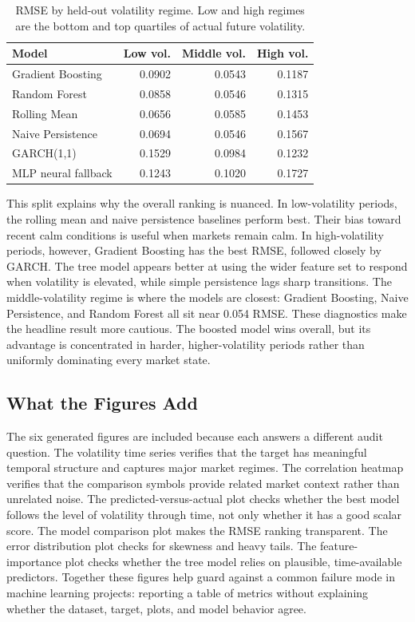 \documentclass{article}
\begin{document}
\begin{table}[t]
  \centering
  \caption{RMSE by held-out volatility regime. Low and high regimes are the bottom and top quartiles of actual future volatility.}
  \label{tab:regime}
  \begin{tabular}{lrrr}
    \toprule
    Model & Low vol. & Middle vol. & High vol. \\
    \midrule
    Gradient Boosting & 0.0902 & 0.0543 & 0.1187 \\
    Random Forest & 0.0858 & 0.0546 & 0.1315 \\
    Rolling Mean & 0.0656 & 0.0585 & 0.1453 \\
    Naive Persistence & 0.0694 & 0.0546 & 0.1567 \\
    GARCH(1,1) & 0.1529 & 0.0984 & 0.1232 \\
    MLP neural fallback & 0.1243 & 0.1020 & 0.1727 \\
    \bottomrule
  \end{tabular}
\end{table}

This split explains why the overall ranking is nuanced. In low-volatility periods, the rolling mean and naive persistence baselines perform best. Their bias toward recent calm conditions is useful when markets remain calm. In high-volatility periods, however, Gradient Boosting has the best RMSE, followed closely by GARCH. The tree model appears better at using the wider feature set to respond when volatility is elevated, while simple persistence lags sharp transitions. The middle-volatility regime is where the models are closest: Gradient Boosting, Naive Persistence, and Random Forest all sit near 0.054 RMSE. These diagnostics make the headline result more cautious. The boosted model wins overall, but its advantage is concentrated in harder, higher-volatility periods rather than uniformly dominating every market state.

\subsection{What the Figures Add}
The six generated figures are included because each answers a different audit question. The volatility time series verifies that the target has meaningful temporal structure and captures major market regimes. The correlation heatmap verifies that the comparison symbols provide related market context rather than unrelated noise. The predicted-versus-actual plot checks whether the best model follows the level of volatility through time, not only whether it has a good scalar score. The model comparison plot makes the RMSE ranking transparent. The error distribution plot checks for skewness and heavy tails. The feature-importance plot checks whether the tree model relies on plausible, time-available predictors. Together these figures help guard against a common failure mode in machine learning projects: reporting a table of metrics without explaining whether the dataset, target, plots, and model behavior agree.
\end{document}
